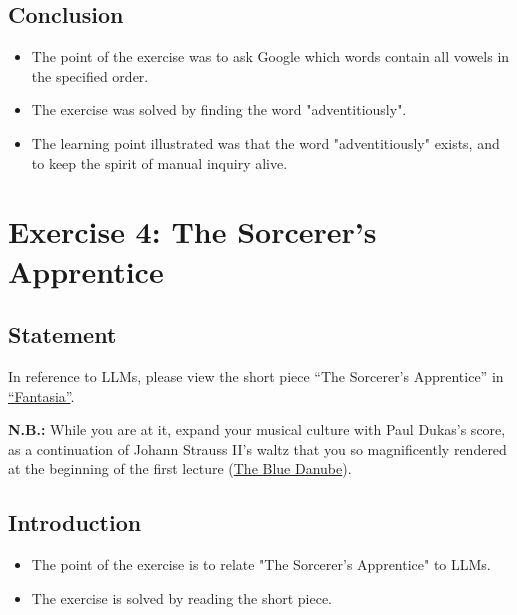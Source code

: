 \documentclass[12pt]{article}
\begin{document}

\subsection{Conclusion}

\begin{itemize}

\item
  The point of the exercise was to ask Google which words contain all vowels in the specified order.

\item
  The exercise was solved by finding the word "adventitiously".

\item
  The learning point illustrated was that the word "adventitiously" exists, and to keep the spirit of manual inquiry alive.

\end{itemize}


\newpage

\section{Exercise 4: The Sorcerer's Apprentice}


\subsection{Statement}

In reference to LLMs, please view the short piece ``The Sorcerer's Apprentice''
in \href{https://en.wikipedia.org/wiki/Fantasia_(1940_film)}{``Fantasia''}.

\textbf{N.B.:} While you are at it, expand your musical culture with Paul
Dukas's score, as a continuation of Johann Strauss II's waltz that you so
magnificently rendered at the beginning of the first lecture
(\href{https://en.wikipedia.org/wiki/The_Blue_Danube}{The Blue Danube}).


\subsection{Introduction}

\begin{itemize}

\item
  The point of the exercise is to relate "The Sorcerer's Apprentice" to LLMs.

\item
  The exercise is solved by reading the short piece.

\end{itemize}
\end{document}
